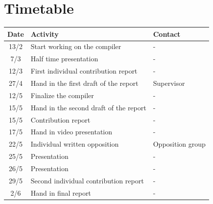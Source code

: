 \documentclass[12pt,a4paper]{article}
\begin{document}
\section{Timetable}
\begin{center}
\begin{tabular}{|c|l|l|}
\hline
\textbf{Date} & \textbf{Activity}  & \textbf{Contact} \\ 
\hline
\hline
13/2 & Start working on the compiler                        & - \\ 
\hline
7/3  & Half time presentation                               & - \\
\hline
12/3 & First individual contribution report                 & - \\
\hline
27/4 & Hand in the first draft of the report                    & Supervisor \\
\hline
12/5 & Finalize the compiler                                & - \\
\hline
15/5 & Hand in the second draft of the report                   & - \\
\hline
15/5 & Contribution report                                  & - \\
\hline
17/5 & Hand in video presentation                           & - \\
\hline
22/5 & Individual written opposition                        & Opposition group \\
\hline
25/5 & Presentation                                         & - \\
\hline
26/5 & Presentation                                         & - \\
\hline
29/5 & Second individual contribution report                & - \\
\hline
2/6  & Hand in final report                                 & - \\
\hline
\end{tabular}
\end{center}

\newpage
\printbibliography
\end{document}
